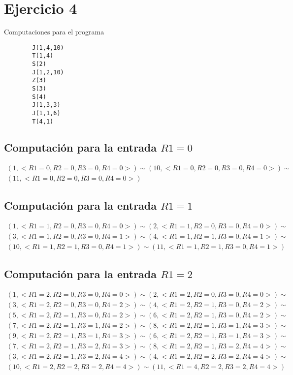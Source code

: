 \section{Ejercicio 4}
  		Computaciones para el programa
  		\begin{verbatim}
		J(1,4,10)
		T(1,4)
		S(2)
		J(1,2,10)
		Z(3)
		S(3)
		S(4)
		J(1,3,3)
		J(1,1,6)
		T(4,1)
  		\end{verbatim}
  		\subsection{Computación para la entrada $R1=0$}
  		\begin{equation*}\begin{gathered}
		(1, <R1=0, R2=0, R3=0, R4=0>) \sim (10, <R1=0, R2=0, R3=0, R4=0>) \sim\\
		(11, <R1=0, R2=0, R3=0, R4=0>)
		\end{gathered}\end{equation*}
		\subsection{Computación para la entrada $R1=1$}
  		\begin{equation*}\begin{gathered}
		(1, <R1=1, R2=0, R3=0, R4=0>) \sim (2, <R1=1, R2=0, R3=0, R4=0>) \sim\\
		(3, <R1=1, R2=0, R3=0, R4=1>) \sim (4, <R1=1, R2=1, R3=0, R4=1>) \sim\\
		(10, <R1=1, R2=1, R3=0, R4=1>) \sim (11, <R1=1, R2=1, R3=0, R4=1>)
		\end{gathered}\end{equation*}
		\subsection{Computación para la entrada $R1=2$}
		\begin{equation*}\begin{gathered}
		(1, <R1=2, R2=0, R3=0, R4=0>) \sim (2, <R1=2, R2=0, R3=0, R4=0>) \sim\\
		(3, <R1=2, R2=0, R3=0, R4=2>) \sim (4, <R1=2, R2=1, R3=0, R4=2>) \sim\\
		(5, <R1=2, R2=1, R3=0, R4=2>) \sim (6, <R1=2, R2=1, R3=0, R4=2>) \sim\\
		(7, <R1=2, R2=1, R3=1, R4=2>) \sim (8, <R1=2, R2=1, R3=1, R4=3>) \sim\\ 
		(9, <R1=2, R2=1, R3=1, R4=3>) \sim (6, <R1=2, R2=1, R3=1, R4=3>) \sim\\
		(7, <R1=2, R2=1, R3=2, R4=3>) \sim (8, <R1=2, R2=1, R3=2, R4=4>) \sim\\
		(3, <R1=2, R2=1, R3=2, R4=4>) \sim (4, <R1=2, R2=2, R3=2, R4=4>) \sim\\
		(10, <R1=2, R2=2, R3=2, R4=4>) \sim (11, <R1=4, R2=2, R3=2, R4=4>)
		\end{gathered}\end{equation*}
